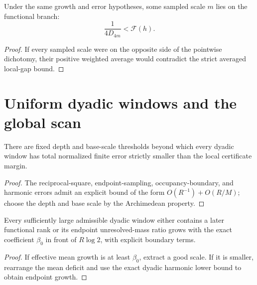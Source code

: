 \begin{corollary}
  \label{cor:good-scale}
  \leanok
  Under the same growth and error hypotheses, some sampled scale $m$ lies on
  the functional branch:
  \[
    \frac{1}{4D_{4m}}<\mathcal F(h).
  \]
\end{corollary}

\begin{proof}
  \leanok
  If every sampled scale were on the opposite side of the pointwise
  dichotomy, their positive weighted average would contradict the strict
  averaged local-gap bound.
\end{proof}

\section{Uniform dyadic windows and the global scan}

\begin{theorem}
  \label{thm:uniform-window}
  \leanok
  There are fixed depth and base-scale thresholds beyond which every dyadic
  window has total normalized finite error strictly smaller than the local
  certificate margin.
\end{theorem}

\begin{proof}
  \leanok
  The reciprocal-square, endpoint-sampling, occupancy-boundary, and harmonic
  errors admit an explicit bound of the form $O(R^{-1})+O(R/M)$; choose the
  depth and base scale by the Archimedean property.
\end{proof}

\begin{theorem}
  \label{thm:dyadic-dichotomy}
  \leanok
  Every sufficiently large admissible dyadic window either contains a later
  functional rank or its endpoint unresolved-mass ratio grows with the exact
  coefficient $\beta_0$ in front of $R\log 2$, with explicit boundary terms.
\end{theorem}

\begin{proof}
  \leanok
  If effective mean growth is at least $\beta_0$, extract a good scale.  If it
  is smaller, rearrange the mean deficit and use the exact dyadic harmonic
  lower bound to obtain endpoint growth.
\end{proof}

